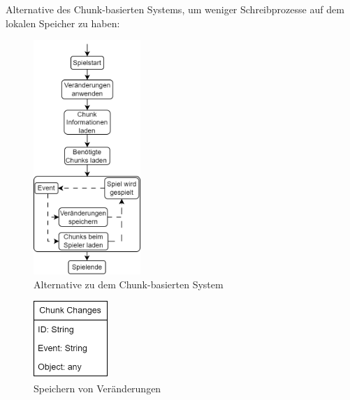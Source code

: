 Alternative des Chunk-basierten Systems, um weniger Schreibprozesse auf dem lokalen Speicher zu haben:

\begin{figure}[htp]
    \centering
    \includegraphics[width=0.36\textwidth]{images/Chunkbasiert2.png}
    \caption{Alternative zu dem Chunk-basierten System}
    \label{fig:altchunkBasedSystem}
\end{figure}

\begin{figure}[htp]
    \centering
    \includegraphics[width=0.25\textwidth]{images/Changes.png}
    \caption{Speichern von Veränderungen}
    \label{fig:changesClass}
\end{figure}

